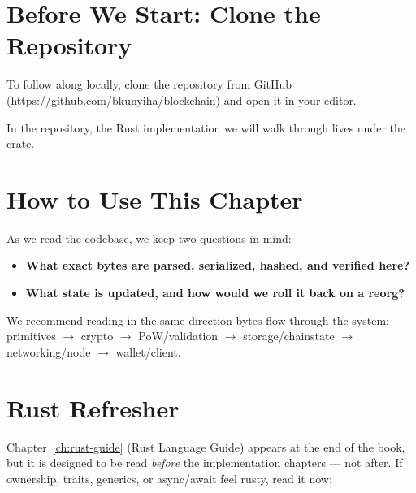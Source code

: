 \section{Before We Start: Clone the Repository}
\label{sec:ch05-clone-repo}

To follow along locally, clone the repository from GitHub (\url{https://github.com/bkunyiha/blockchain}) and open it in your editor.

In the repository, the Rust implementation we will walk through lives under the  crate.

\section{How to Use This Chapter}
\label{sec:ch05-how-to-use}

As we read the codebase, we keep two questions in mind:

\begin{itemize}
  \item \textbf{What exact bytes are parsed, serialized, hashed, and verified here?}
  \item \textbf{What state is updated, and how would we roll it back on a reorg?}
\end{itemize}

We recommend reading in the same direction bytes flow through the system: primitives \(\to\) crypto \(\to\) PoW/validation \(\to\) storage/chainstate \(\to\) networking/node \(\to\) wallet/client.

\section{Rust Refresher}
\label{sec:ch05-rust-refresher}

Chapter~\ref{ch:rust-guide} (Rust Language Guide) appears at the end of the book, but it is designed to be read \emph{before} the implementation chapters --- not after. If ownership, traits, generics, or async/await feel rusty, read it now:

